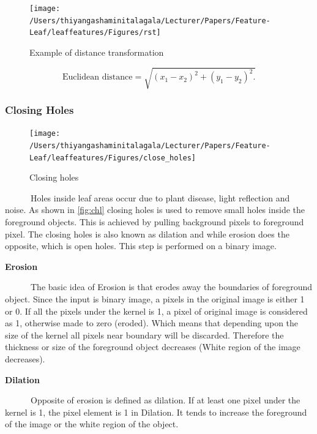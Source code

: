 \documentclass{article}
\begin{document}
\begin{figure}[!ht]

{\centering \texttt{[image: /Users/thiyangashaminitalagala/Lecturer/Papers/Feature-Leaf/leaffeatures/Figures/rst]} 

}

\caption{\label{fig:rstex}Example of distance transformation}\label{fig:unnamed-chunk-8}
\end{figure}

\begin{equation}
    \text{Euclidean distance} = \sqrt{(x_1 - x_2)^2 + (y_1 - y_2)^2.}
    \label{eu}
\end{equation}

\hypertarget{closing-holes}{%
\subsubsection{Closing Holes}\label{closing-holes}}

\begin{figure}[!ht]

{\centering \texttt{[image: /Users/thiyangashaminitalagala/Lecturer/Papers/Feature-Leaf/leaffeatures/Figures/close\_holes]} 

}

\caption{\label{fig:chl}Closing holes}\label{fig:unnamed-chunk-9}
\end{figure}

~~~~~~Holes inside leaf areas occur due to plant disease, light
reflection and noise. As shown in \ref{fig:chl} closing holes is used to
remove small holes inside the foreground objects. This is achieved by
pulling background pixels to foreground pixel. The closing holes is also
known as dilation and while erosion does the opposite, which is open
holes. This step is performed on a binary image.

\textbf{Erosion}

~~~~~~The basic idea of Erosion is that erodes away the boundaries of
foreground object. Since the input is binary image, a pixels in the
original image is either 1 or 0. If all the pixels under the kernel is
1, a pixel of original image is considered as 1, otherwise made to zero
(eroded). Which means that depending upon the size of the kernel all
pixels near boundary will be discarded. Therefore the thickness or size
of the foreground object decreases (White region of the image
decreases).

\textbf{Dilation}

~~~~~~Opposite of erosion is defined as dilation. If at least one pixel
under the kernel is 1, the pixel element is 1 in Dilation. It tends to
increase the foreground of the image or the white region of the object.
\end{document}
